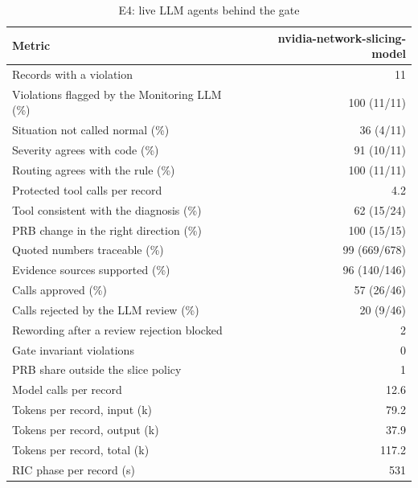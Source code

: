 \begin{table}[!t]
\centering
\caption{E4: live LLM agents behind the gate}\label{tab:live}
\footnotesize
\setlength{\tabcolsep}{3pt}
\begin{tabular}{@{}lr@{}}
\toprule
Metric & nvidia-network-slicing-model \\
\midrule
Records with a violation & 11 \\
Violations flagged by the Monitoring LLM (\%) & 100 (11/11) \\
Situation not called normal (\%) & 36 (4/11) \\
Severity agrees with code (\%) & 91 (10/11) \\
Routing agrees with the rule (\%) & 100 (11/11) \\
Protected tool calls per record & 4.2 \\
Tool consistent with the diagnosis (\%) & 62 (15/24) \\
PRB change in the right direction (\%) & 100 (15/15) \\
Quoted numbers traceable (\%) & 99 (669/678) \\
Evidence sources supported (\%) & 96 (140/146) \\
Calls approved (\%) & 57 (26/46) \\
Calls rejected by the LLM review (\%) & 20 (9/46) \\
Rewording after a review rejection blocked & 2 \\
Gate invariant violations & 0 \\
PRB share outside the slice policy & 1 \\
Model calls per record & 12.6 \\
Tokens per record, input (k) & 79.2 \\
Tokens per record, output (k) & 37.9 \\
Tokens per record, total (k) & 117.2 \\
RIC phase per record (s) & 531 \\
\bottomrule
\end{tabular}
\end{table}
